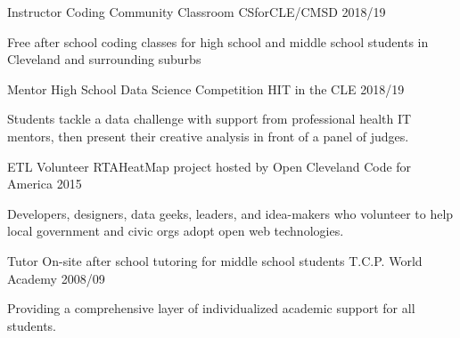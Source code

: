 

\begin{cventries}

  \cventry
    {Instructor} %
    {Coding Community Classroom} %
    {CSforCLE/CMSD} %
    {2018/19} %
    {
      \begin{cvitems} %
        \item {Free after school coding classes for high school and middle school students in Cleveland and surrounding suburbs}
      \end{cvitems}
    }

  \cventry
    {Mentor} %
    {High School Data Science Competition} %
    {HIT in the CLE} %
    {2018/19} %
    {
      \begin{cvitems} %
        \item {Students tackle a data challenge with support from professional health IT mentors, then present their creative analysis in front of a panel of judges.}
      \end{cvitems}
    }

  \cventry
    {ETL Volunteer} %
    {RTAHeatMap project hosted by Open Cleveland} %
    {Code for America} %
    {2015} %
    {
      \begin{cvitems} %
        \item {Developers, designers, data geeks, leaders, and idea-makers who volunteer to help local government and civic orgs adopt open web technologies.}
      \end{cvitems}
    }

  \cventry
    {Tutor} %
    {On-site after school tutoring for middle school students} %
    {T.C.P. World Academy} %
    {2008/09} %
    {
      \begin{cvitems} %
        \item {Providing a comprehensive layer of individualized academic support for all students.}
      \end{cvitems}
    }

\end{cventries}
